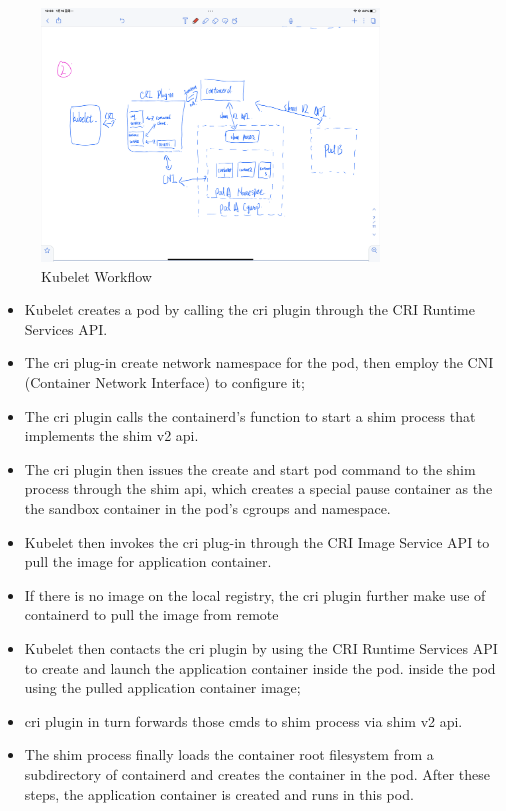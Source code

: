     \begin{figure}[H]
        \centering
        \includegraphics[width=0.8\textwidth]{images/IMG_4417.PNG}
        \caption[Kubelet Workflow]{Kubelet Workflow}
        \label{fig:Kubelet}
    \end{figure}


    \begin{itemize}
        \item Kubelet creates a pod by calling the cri plugin through the CRI Runtime Services API.
        \item The cri plug-in create network namespace for the pod, then employ the CNI (Container Network Interface) to configure it;
        \item The cri plugin calls the containerd's function to start a shim process that implements the shim v2 api.
        \item The cri plugin then issues the create and start pod command to the shim process through the shim api, which creates a special pause container as the the sandbox container in the pod's cgroups and namespace.
        \item Kubelet then invokes the cri plug-in through the CRI Image Service API to pull the image for application container.
        \item If there is no image on the local registry, the cri plugin further make use of containerd to pull the image from remote
        \item Kubelet then contacts the cri plugin by using the CRI Runtime Services API to create and launch the application container inside the pod. inside the pod using the pulled application container image;
        \item cri plugin in turn forwards those cmds to shim process via shim v2 api.
        \item The shim process finally loads the container root filesystem from a subdirectory of containerd and creates the container in the pod. After these steps, the application container is created and runs in this pod.
    \end{itemize}


